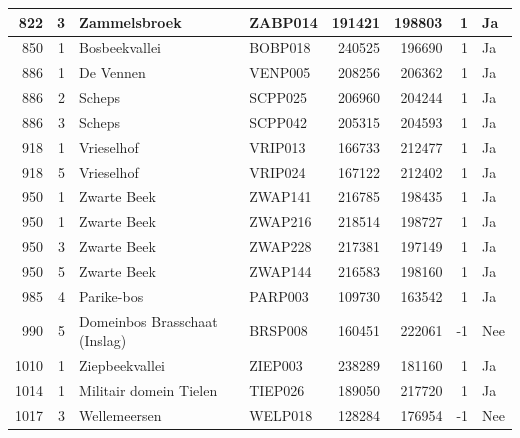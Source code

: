 \documentclass[11pt,]{book}
\begin{document}
\begin{table}
\begin{tabular}[t]{r|r|l|l|r|r|r|l}
\hline
822 & 3 & Zammelsbroek & ZABP014 & 191421 & 198803 & 1 & Ja\\
\hline
850 & 1 & Bosbeekvallei & BOBP018 & 240525 & 196690 & 1 & Ja\\
\hline
886 & 1 & De Vennen & VENP005 & 208256 & 206362 & 1 & Ja\\
\hline
886 & 2 & Scheps & SCPP025 & 206960 & 204244 & 1 & Ja\\
\hline
886 & 3 & Scheps & SCPP042 & 205315 & 204593 & 1 & Ja\\
\hline
918 & 1 & Vrieselhof & VRIP013 & 166733 & 212477 & 1 & Ja\\
\hline
918 & 5 & Vrieselhof & VRIP024 & 167122 & 212402 & 1 & Ja\\
\hline
950 & 1 & Zwarte Beek & ZWAP141 & 216785 & 198435 & 1 & Ja\\
\hline
950 & 1 & Zwarte Beek & ZWAP216 & 218514 & 198727 & 1 & Ja\\
\hline
950 & 3 & Zwarte Beek & ZWAP228 & 217381 & 197149 & 1 & Ja\\
\hline
950 & 5 & Zwarte Beek & ZWAP144 & 216583 & 198160 & 1 & Ja\\
\hline
985 & 4 & Parike-bos & PARP003 & 109730 & 163542 & 1 & Ja\\
\hline
990 & 5 & Domeinbos Brasschaat (Inslag) & BRSP008 & 160451 & 222061 & -1 & Nee\\
\hline
1010 & 1 & Ziepbeekvallei & ZIEP003 & 238289 & 181160 & 1 & Ja\\
\hline
1014 & 1 & Militair domein Tielen & TIEP026 & 189050 & 217720 & 1 & Ja\\
\hline
1017 & 3 & Wellemeersen & WELP018 & 128284 & 176954 & -1 & Nee\\
\hline
\end{tabular}
\end{table}
\end{document}
